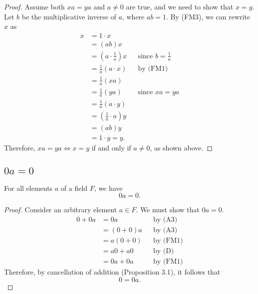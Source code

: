 \documentclass[11pt]{article}
\begin{document}
    \begin{proof}
        Assume both \(xa = ya\) and \(a \neq 0\) are true, and we need to show that \(x = y\). Let $b$ be the multiplicative inverse of $a$, where \(ab = 1\). By (FM3), we can rewrite $x$ as
        \begin{align*}
            x &= 1 \cdot x                                                           \\
              &= (ab)x                                                               \\
              &= \left(a \cdot \frac{1}{a}\right) x && \text{since } b = \frac{1}{a} \\
              &= \frac{1}{a} (a \cdot x) && \text{by (FM1)}                          \\
              &= \frac{1}{a} (xa)                                                    \\
              &= \frac{1}{a} (ya) && \text{since } xa = ya                           \\
              &= \frac{1}{a} (a \cdot y)                                             \\
              &= \left(\frac{1}{a} \cdot a\right) y                                  \\
              &= (ab)y                                                               \\
              &= 1 \cdot y = y.
        \end{align*}
        Therefore, \(xa = ya \Leftrightarrow x = y\) if and only if \(a \neq 0\), as shown above. 
    \end{proof}

    \subsection{$0a = 0$}

    For all elements $a$ of a field $F$, we have \[0a = 0.\]
    \begin{proof}
        Consider an arbitrary element \(a \in F.\) We must show that \(0a = 0.\)
        \begin{align*}
            0 + 0a &= 0a        && \text{by (A3)} \\
                   &= (0+0)a    && \text{by (A3)} \\
                   &= a(0 + 0)  && \text{by (FM1)} \\
                   &= a0 + a0   && \text{by (D)} \\
                   &= 0a + 0a   && \text{by (FM1)}
        \end{align*}
        Therefore, by cancellation of addition (Proposition 3.1), it follows that \[0 = 0a.\]
    \end{proof}
\end{document}
